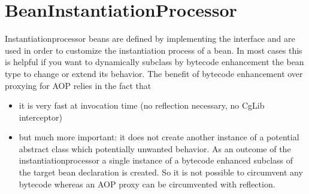 \section{BeanInstantiationProcessor}
\label{feature:BeanInstantiationProcessor}
\ClearAPI
Instantiationprocessor beans are defined by implementing the interface  and are used in order to customize the instantiation process of a bean. In most cases this is helpful if you want to dynamically subclass by bytecode enhancement the bean type to change or extend its behavior.\newline
The benefit of bytecode enhancement over proxying for AOP relies in the fact that
\begin{itemize}
	\item it is very fast at invocation time (no reflection necessary, no CgLib interceptor)
	\item but much more important: it does not create another instance of a potential abstract class which potentially unwanted behavior. As an outcome of the instantiationprocessor a single instance of a bytecode enhanced subclass of the target bean declaration is created. So it is not possible to circumvent any bytecode whereas an AOP proxy can be circumvented with reflection.
\end{itemize}

 